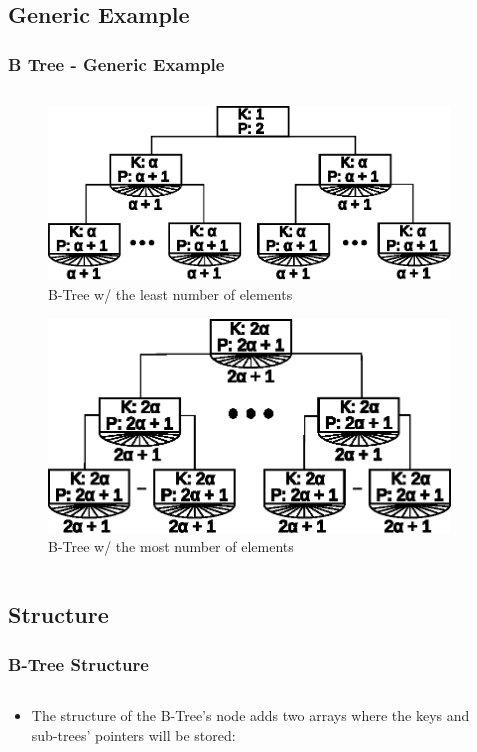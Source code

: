 \documentclass{beamer}
\begin{document}
\begin{frame}
    \subsection{Generic Example}
    \frametitle{B Tree - Generic Example}
    \begin{columns}
        \begin{column}{\textlecolumn}
            \begin{figure}[h!]
                \includegraphics[width=0.5\linewidth]{resources/made/generic_min_btree.eps}
                \caption{B-Tree w/ the least number of elements}
            \end{figure}
            \begin{figure}[h!]
                \includegraphics[width=0.5\linewidth]{resources/made/generic_max_btree.eps}
                \caption{B-Tree w/ the most number of elements}
            \end{figure}
        \end{column}
        \begin{column}{\textricolumn}
        \end{column}
    \end{columns}
\end{frame}
\begin{frame}
    \subsection{Structure}
    \frametitle{B-Tree Structure}
    \begin{columns}
        \begin{column}{\textlecolumn}
            \begin{block}{}
                \begin{itemize}
                    \item The structure of the B-Tree's node adds two arrays where the keys and sub-trees' pointers will be stored:
                \end{itemize}
            \end{block}
            \begin{block}
                \btreeStructure
            \end{block}
        \end{column}
        \begin{column}{\textricolumn}
        \end{column}
    \end{columns}
\end{frame}
\end{document}
